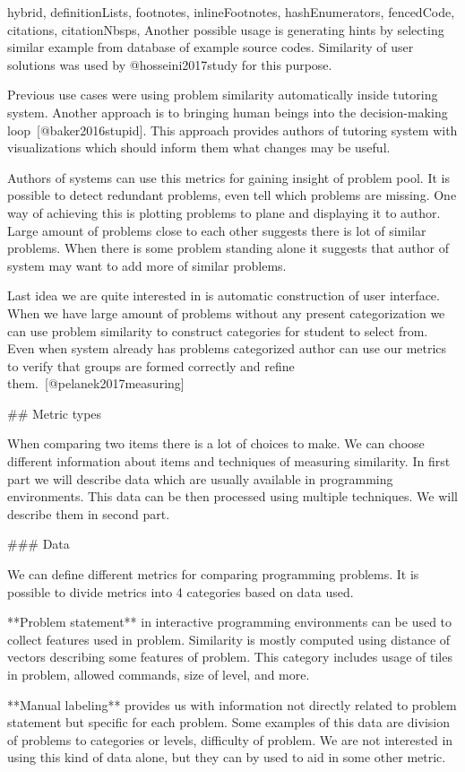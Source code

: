 \documentclass[
  digital, %
  table,   %
  nolof,     %
  nolot,     %
  nocover
]{fithesis3}
\begin{document}
\begin{markdown*}{%
  hybrid,
  definitionLists,
  footnotes,
  inlineFootnotes,
  hashEnumerators,
  fencedCode,
  citations,
  citationNbsps,
}
Another possible usage is generating hints by selecting similar example from database of example source codes. Similarity of user solutions was used by @hosseini2017study for this purpose.

Previous use cases were using problem similarity automatically inside tutoring system. Another approach is to bringing human beings into the decision-making loop~[@baker2016stupid]. This approach provides authors of tutoring system with visualizations which should inform them what changes may be useful.

Authors of systems can use this metrics for gaining insight of problem pool. It is possible to detect redundant problems, even tell which problems are missing. One way of achieving this is plotting problems to plane and displaying it to author. Large amount of problems close to each other suggests there is lot of similar problems. When there is some problem standing alone it suggests that author of system may want to add more of similar problems.

Last idea we are quite interested in is automatic construction of user interface. When we have large amount of problems without any present categorization we can use problem similarity to construct categories for student to select from. Even when system already has problems categorized author can use our metrics to verify that groups are formed correctly and refine them.~[@pelanek2017measuring]

## Metric types

When comparing two items there is a lot of choices to make. We can choose different information about items and techniques of measuring similarity. In first part we will describe data which are usually available in programming environments. This data can be then processed using multiple techniques. We will describe them in second part.

### Data

We can define different metrics for comparing programming problems. It is possible to divide metrics into 4 categories based on data used.

**Problem statement** in interactive programming environments can be used to collect features used in problem. Similarity is mostly computed using distance of vectors describing some features of problem. This category includes usage of tiles in problem, allowed commands, size of level, and more.

**Manual labeling** provides us with information not directly related to problem statement but specific for each problem. Some examples of this data are division of problems to categories or levels, difficulty of problem. We are not interested in using this kind of data alone, but they can by used to aid in some other metric.


\end{markdown*}
\end{document}
